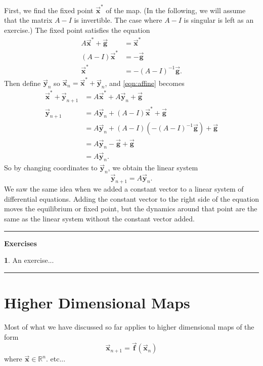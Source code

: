 \documentclass[reqno]{immbook}
\newcommand{\Real}{\mathbb{R}}
\newcommand{\BF}{\vec{\textbf{f}}}
\newcommand{\BG}{\vec{\textbf{g}}}
\newcommand{\BX}{\vec{\textbf{x}}}
\newcommand{\BY}{\vec{\textbf{y}}}
\numberwithin{equation}{chapter}
\numberwithin{question}{section}
\numberwithin{theorem}{chapter}
\numberwithin{figure}{chapter}
\theoremstyle{definition}
\newtheorem{exercise}{}[section]
\newenvironment{exercises}%
{%
\medskip\hrule\medskip\noindent\textbf{Exercises}%
}%
{%
\medskip\hrule
}
\begin{document}
First, we find the fixed point $\BX^*$ of the map.
(In the following, we will assume that 
the matrix $A-I$ is invertible.  The case
where $A-I$ is singular is left as an exercise.)
The fixed point satisfies the equation
\begin{equation}
\begin{split}
   A\BX^* + \BG & = \BX^* \\
   (A-I)\BX^* & = -\BG \\
       \BX^* & = -(A-I)^{-1}\BG.
\end{split}
\end{equation}
Then define $\BY_n$ so $\BX_n = \BX^* + \BY_n$,
and \eqref{eqn:affine} becomes
\begin{equation}
\begin{split}
  \BX^* + \BY_{n+1} & = A\BX^* + A\BY_n +\BG \\
  \BY_{n+1} & = A\BY_n + (A-I)\BX^* + \BG \\
            & = A\BY_n + (A-I)\left(-(A-I)^{-1}\BG\right)+\BG \\
	    & = A\BY_n -\BG+\BG \\
	    & = A\BY_n.
\end{split}
\end{equation}
So by changing coordinates to $\BY_n$, we obtain
the linear system
\begin{equation}
  \BY_{n+1} = A\BY_n .
\end{equation}
We saw the same idea when we added a constant vector to a
linear system of differential equations.
Adding the constant vector to the right side of the equation
moves the equilibrium or fixed point, but
the dynamics around that point are the same
as the linear system without the constant vector added.

\begin{exercises}
\begin{exercise}
An exercise...
\end{exercise}
\end{exercises}

\section{Higher Dimensional Maps}
%
Most of what we have discussed so far applies to
higher dimensional maps of the form
\begin{equation}
  \BX_{n+1} = \BF(\BX_n)
\end{equation}
where $\BX \in \Real^n$. etc...
\end{document}
